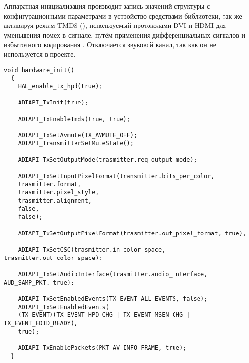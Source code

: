 Аппаратная инициализация производит запись значений структуры с конфигурационными
параметрами в устройство средствами библиотеки, так же активируя режим
TMDS (), используемый протоколами
DVI и HDMI для уменьшения помех в сигнале, путём применения дифференциальных сигналов
и избыточного кодирования . Отключается звуковой канал, так как он не
используется в проекте.
\medskip
\begin{lstlisting}[style=C]
  void hardware_init()
  {
    HAL_enable_tx_hpd(true);

    ADIAPI_TxInit(true);

    ADIAPI_TxEnableTmds(true, true);

    ADIAPI_TxSetAvmute(TX_AVMUTE_OFF);
    ADIAPI_TransmitterSetMuteState();

    ADIAPI_TxSetOutputMode(trasmitter.req_output_mode);

    ADIAPI_TxSetInputPixelFormat(transmitter.bits_per_color,
    trasmitter.format,
    trasmitter.pixel_style,
    trasmitter.alignment,
    false,
    false);

    ADIAPI_TxSetOutputPixelFormat(trasmitter.out_pixel_format, true);

    ADIAPI_TxSetCSC(trasmitter.in_color_space, trasmitter.out_color_space);

    ADIAPI_TxSetAudioInterface(trasmitter.audio_interface, AUD_SAMP_PKT, true);

    ADIAPI_TxSetEnabledEvents(TX_EVENT_ALL_EVENTS, false);
    ADIAPI_TxSetEnabledEvents(
    (TX_EVENT)(TX_EVENT_HPD_CHG | TX_EVENT_MSEN_CHG | TX_EVENT_EDID_READY),
    true);

    ADIAPI_TxEnablePackets(PKT_AV_INFO_FRAME, true);
  }
\end{lstlisting}
\medskip

